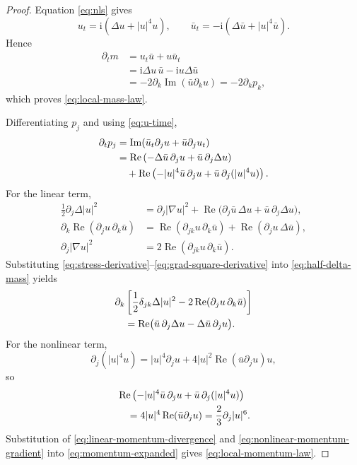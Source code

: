 \documentclass{interact}
\numberwithin{equation}{section}
\theoremstyle{plain}
\theoremstyle{definition}
\theoremstyle{remark}
\newcommand{\ii}{\mathrm i}
\newcommand{\Rea}{\operatorname{Re}}
\newcommand{\Ima}{\operatorname{Im}}
\begin{document}
\begin{proof}
Equation \eqref{eq:nls} gives
\begin{equation}\label{eq:u-time}
 u_t=\ii(\Delta u+|u|^4u),
 \qquad
 \bar u_t=-\ii(\Delta\bar u+|u|^4\bar u).
\end{equation}
Hence
\begin{align*}
 \partial_tm
 &=u_t\bar u+u\bar u_t\\
 &=\ii\Delta u\,\bar u-\ii u\Delta\bar u\\
 &=-2\partial_k\Ima(\bar u\partial_ku)
 =-2\partial_kp_k,
\end{align*}
which proves \eqref{eq:local-mass-law}.

Differentiating $p_j$ and using \eqref{eq:u-time},
\begin{align}
 \partial_tp_j
 &=\Ima(\bar u_t\partial_ju+\bar u\partial_ju_t)\notag\\
 &=\Rea\left(-\Delta\bar u\,\partial_ju+\bar u\,\partial_j\Delta u\right)\notag\\
 &\quad+\Rea\left(-|u|^4\bar u\,\partial_ju+\bar u\,\partial_j(|u|^4u)\right).
 \label{eq:momentum-expanded}
\end{align}
For the linear term,
\begin{align}
 \frac12\partial_j\Delta|u|^2
 &=\partial_j|\nabla u|^2
 +\Rea\bigl(\partial_j\bar u\,\Delta u+\bar u\,\partial_j\Delta u\bigr),
 \label{eq:half-delta-mass}\\
 \partial_k\Rea(\partial_ju\,\partial_k\bar u)
 &=\Rea(\partial_{jk}u\,\partial_k\bar u)
 +\Rea(\partial_ju\,\Delta\bar u),
 \label{eq:stress-derivative}\\
 \partial_j|\nabla u|^2
 &=2\Rea(\partial_{jk}u\,\partial_k\bar u).
 \label{eq:grad-square-derivative}
\end{align}
Substituting \eqref{eq:stress-derivative}--\eqref{eq:grad-square-derivative} into \eqref{eq:half-delta-mass} yields
\begin{align}
 &\partial_k\left[\frac12\delta_{jk}\Delta|u|^2
 -2\Rea(\partial_ju\,\partial_k\bar u)\right]\notag\\
 &\quad=\Rea\bigl(\bar u\,\partial_j\Delta u-\Delta\bar u\,\partial_ju\bigr).
 \label{eq:linear-momentum-divergence}
\end{align}
For the nonlinear term,
\[
 \partial_j(|u|^4u)
 =|u|^4\partial_ju+4|u|^2\Rea(\bar u\partial_ju)u,
\]
so
\begin{align}
 &\Rea\left(-|u|^4\bar u\,\partial_ju+\bar u\,\partial_j(|u|^4u)\right)\notag\\
 &\quad=4|u|^4\Rea(\bar u\partial_ju)
 =\frac23\partial_j|u|^6.
 \label{eq:nonlinear-momentum-gradient}
\end{align}
Substitution of \eqref{eq:linear-momentum-divergence} and \eqref{eq:nonlinear-momentum-gradient} into \eqref{eq:momentum-expanded} gives \eqref{eq:local-momentum-law}.
\end{proof}
\end{document}
